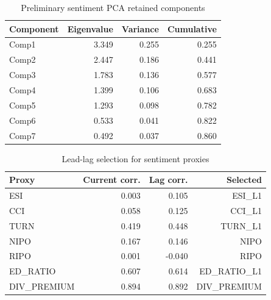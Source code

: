 \begin{table}[H]
\centering
\caption{Preliminary sentiment PCA retained components}
\label{tab:sentiment_pca_stage1_eigen}
\begin{tabular}{lrrr}
\toprule
Component & Eigenvalue & Variance & Cumulative \\
\midrule
Comp1 & 3.349 & 0.255 & 0.255 \\
Comp2 & 2.447 & 0.186 & 0.441 \\
Comp3 & 1.783 & 0.136 & 0.577 \\
Comp4 & 1.399 & 0.106 & 0.683 \\
Comp5 & 1.293 & 0.098 & 0.782 \\
Comp6 & 0.533 & 0.041 & 0.822 \\
Comp7 & 0.492 & 0.037 & 0.860 \\
\bottomrule
\end{tabular}
\end{table}

\begin{table}[H]
\centering
\caption{Lead-lag selection for sentiment proxies}
\label{tab:sentiment_pca_lead_lag}
\begin{tabular}{lrrr}
\toprule
Proxy & Current corr. & Lag corr. & Selected \\
\midrule
ESI & 0.003 & 0.105 & ESI\_L1 \\
CCI & 0.058 & 0.125 & CCI\_L1 \\
TURN & 0.419 & 0.448 & TURN\_L1 \\
NIPO & 0.167 & 0.146 & NIPO \\
RIPO & 0.001 & -0.040 & RIPO \\
ED\_RATIO & 0.607 & 0.614 & ED\_RATIO\_L1 \\
DIV\_PREMIUM & 0.894 & 0.892 & DIV\_PREMIUM \\
\bottomrule
\end{tabular}
\end{table}

